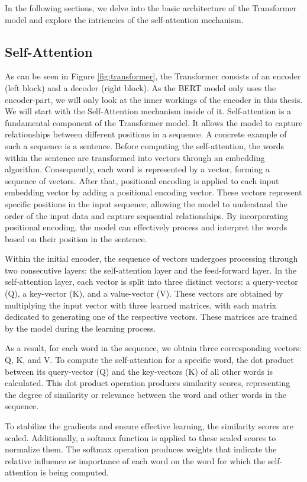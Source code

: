 \documentclass[a4paper,10pt]{report} %
\begin{document}
In the following sections, we delve into the basic architecture of the Transformer model and explore the intricacies of the self-attention mechanism.

\subsection{Self-Attention}
As can be seen in Figure \ref{fig:transformer}, the Transformer consists of an encoder (left block) and a decoder (right block). As the BERT model only uses the encoder-part, we will only look at the inner workings of the encoder in this thesis. We will start with the Self-Attention mechanism inside of it.
Self-attention is a fundamental component of the Transformer model. It allows the model to capture relationships between different positions in a sequence. A concrete example of such a sequence is a sentence. Before computing the self-attention, the words within the sentence are transformed into vectors through an embedding algorithm. Consequently, each word is represented by a vector, forming a sequence of vectors. After that, positional encoding is applied to each input embedding vector by adding a positional encoding vector. These vectors represent specific positions in the input sequence, allowing the model to understand the order of the input data and capture sequential relationships. By incorporating positional encoding, the model can effectively process and interpret the words based on their position in the sentence.

Within the initial encoder, the sequence of vectors undergoes processing through two consecutive layers: the self-attention layer and the feed-forward layer. In the self-attention layer, each vector is split into three distinct vectors: a query-vector (Q), a key-vector (K), and a value-vector (V). These vectors are obtained by multiplying the input vector with three learned matrices, with each matrix dedicated to generating one of the respective vectors. These matrices are trained by the model during the learning process.

As a result, for each word in the sequence, we obtain three corresponding vectors: Q, K, and V. To compute the self-attention for a specific word, the dot product between its query-vector (Q) and the key-vectors (K) of all other words is calculated. This dot product operation produces similarity scores, representing the degree of similarity or relevance between the word and other words in the sequence.

To stabilize the gradients and ensure effective learning, the similarity scores are scaled. Additionally, a softmax function is applied to these scaled scores to normalize them. The softmax operation produces weights that indicate the relative influence or importance of each word on the word for which the self-attention is being computed.
\end{document}
